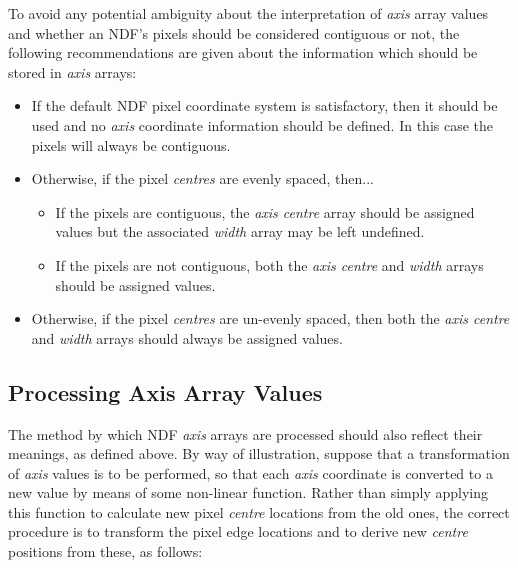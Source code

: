 \documentclass[twoside,11pt]{article}
\newcommand{\xlabel}[1]{}
\newcommand{\st}[1]{{\em{#1}}}
\begin{document}
To avoid any potential ambiguity about the interpretation of \st{axis\/}
array values and whether an NDF's pixels should be considered contiguous or
not, the following recommendations are given about the information which
should be stored in \st{axis\/} arrays: 

\begin{itemize}

\item If the default NDF pixel coordinate system is satisfactory, then it
should be used and no \st{axis\/} coordinate information should be defined.
In this case the pixels will always be contiguous.

\item Otherwise, if the pixel \st{centres\/} are evenly spaced, then...

\begin{itemize}

\item If the pixels are contiguous, the \st{axis centre\/} array should be
assigned values but the associated \st{width\/} array may be left
undefined. 

\item If the pixels are not contiguous, both the \st{axis centre} and
\st{width\/} arrays should be assigned values.  

\end{itemize}

\item Otherwise, if the pixel \st{centres\/} are un-evenly spaced, then
both the \st{axis centre\/} and \st{width\/} arrays should always be
assigned values. 

\end{itemize}

\subsection{\xlabel{processing_axis_array_values}Processing Axis Array Values}

The method by which NDF \st{axis\/} arrays are processed should also
reflect their meanings, as defined above. 
By way of illustration, suppose that a transformation of \st{axis\/} values
is to be performed, so that each \st{axis\/} coordinate is converted to a
new value by means of some non-linear function. 
Rather than simply applying this function to calculate new pixel
\st{centre\/} locations from the old ones, the correct procedure is to
transform 
the pixel edge locations and to derive new \st{centre\/} positions from
these, as follows: 
\end{document}
